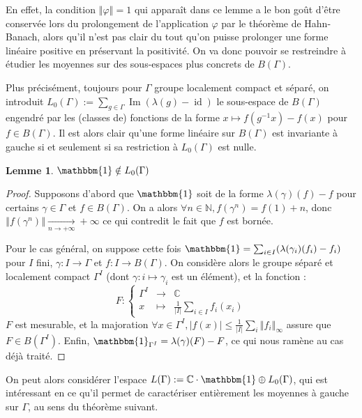 \documentclass[a4paper,12pt]{article}
\newtheorem{lemma}[theorem]{Lemme}
\newcommand{\N}{\mathbb{N}}
\newcommand{\C}{\mathbb{C}}
\newcommand{\norm}[1]{\left\Vert #1\right\Vert}
\newcommand{\abs}[1]{\left\vert#1\right\vert}
\newcommand{\card}[1]{\abs{#1}}
\newcommand{\indic}{\mathbbm{1}}
\newcommand\fundef[3]{#1: \left\{\begin{array}{ccc}#2\\#3\end{array}\right.}
\newcommand{\ssi}{si et seulement si }
\newcommand{\inv}{^{-1}}
\newcommand{\TODO}[1]{{\color{red}TODO :} #1}
\DeclareMathOperator{\id}{id}
\DeclareMathOperator{\Ima}{Im}
\begin{document}
En effet, la condition $\norm\varphi = 1$ qui apparaît dans ce lemme a le bon goût d'être conservée lors du prolongement de l'application 
$\varphi$ par le théorème de Hahn-Banach, alors qu'il n'est pas clair du tout qu'on puisse prolonger une forme linéaire positive en préservant 
la positivité. On va donc pouvoir se restreindre à étudier les moyennes sur des sous-espaces plus concrets de $B(\Gamma)$.

Plus précisément, toujours pour $\Gamma$ groupe localement compact et séparé, on introduit $L_0(\Gamma) := \sum_{g\in\Gamma} \Ima(\lambda(g) - \id)$ le sous-espace de 
$B(\Gamma)$ engendré par les (classes de) fonctions de la forme $x\mapsto f(g\inv x) - f(x)$ pour $f\in B(\Gamma)$. 
Il est alors clair qu'une forme linéaire sur $B(\Gamma)$ est invariante à gauche \ssi sa restriction à $L_0(\Gamma)$ est nulle. 

\begin{lemma}
    $\indic\notin L_0(\Gamma)$
\end{lemma}

\begin{proof}
    Supposons d'abord que $\indic$ soit de la forme $\lambda(\gamma)(f) - f$ pour certains $\gamma\in\Gamma$ et 
    $f\in B(\Gamma)$. On a alors $\forall n\in\N, f(\gamma^n) = f(1) + n$, donc $\norm{f(\gamma^n)}\xrightarrow[n\to+\infty]{}+\infty$
    ce qui contredit le fait que $f$ est bornée. 

    Pour le cas général, on suppose cette fois $\indic = \sum_{i\in I} (\lambda(\gamma_i)(f_i) - f_i)$ pour $I$ fini, $\gamma : I \to\Gamma$ et
    $f : I\to B(\Gamma)$. On considère alors le groupe séparé et localement compact $\Gamma^I$ (dont $\gamma : i\mapsto \gamma_i$ est
    un élément), et la fonction : 
    \begin{equation*}
        \fundef{F}{\Gamma^I&\to&\C}{x&\mapsto&\frac{1}{\card{I}}\sum_{i\in I}f_i(x_i)}
    \end{equation*}
    $F$ est mesurable, et la majoration
    $\forall x\in\Gamma^I, \abs{f(x)}\le\frac1{\card{I}}\sum_i\norm{f_i}_\infty$ assure que $F\in B(\Gamma^I)$. 
    Enfin, $\indic_{\Gamma^I} = \lambda(\gamma)(F) - F$, ce qui nous ramène au cas déjà traité. 
\end{proof}

On peut alors considérer l'espace $L(\Gamma) := \C\cdot\indic \oplus L_0(\Gamma)$, qui est intéressant en ce qu'il permet de caractériser entièrement
les moyennes à gauche sur $\Gamma$, au sens du théorème suivant.
\end{document}
